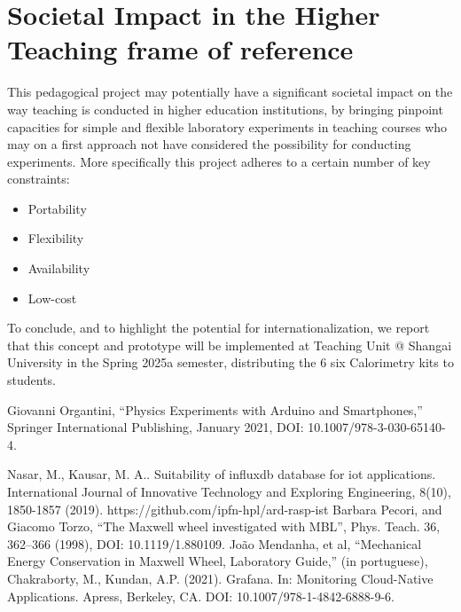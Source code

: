 \documentclass[conference]{IEEEtran}
\begin{document}
\section{Societal Impact in the Higher Teaching frame of reference}
This pedagogical project may potentially have a significant societal impact on the way teaching is conducted in higher education institutions, 
by bringing pinpoint capacities for simple and flexible laboratory experiments in 
teaching courses who may on a first approach not have considered the possibility for conducting experiments.
More specifically this project adheres to a certain number of key constraints:
\begin{itemize}
    \item Portability
    \item Flexibility
    \item Availability
    \item Low-cost
\end{itemize}

To conclude, and to highlight the potential for internationalization, we report that 
this concept and prototype will be implemented at Teaching Unit @ Shangai University in the Spring 2025a semester, distributing the 6 six Calorimetry kits to students.

\begin{thebibliography}{00}
Giovanni Organtini, ``Physics Experiments with Arduino and Smartphones,''
Springer International Publishing, January 2021, DOI: 10.1007/978-3-030-65140-4.

 Nasar, M., Kausar, M. A.. Suitability of influxdb database for iot applications. International Journal of Innovative Technology and Exploring Engineering, 8(10), 1850-1857  (2019).
 https://github.com/ipfn-hpl/ard-rasp-ist
 Barbara Pecori, and Giacomo Torzo,  ``The Maxwell wheel investigated with MBL'', Phys. Teach. 36, 362–366 (1998), DOI: 10.1119/1.880109.
João Mendanha, et al, ``Mechanical Energy Conservation in Maxwell Wheel, Laboratory Guide,'' (in portuguese),
 Chakraborty, M., Kundan, A.P. (2021). Grafana. In: Monitoring Cloud-Native Applications. Apress, Berkeley, CA. DOI: 10.1007/978-1-4842-6888-9-6.
\end{thebibliography}
\end{document}
